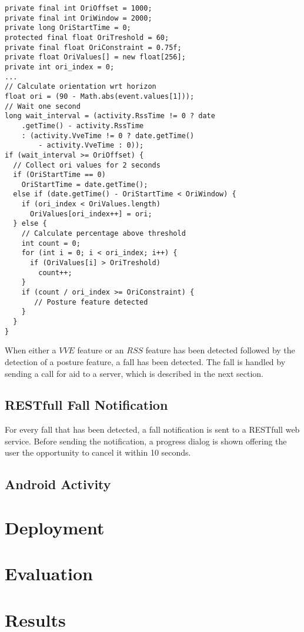 \begin{lstlisting}
private final int OriOffset = 1000;
private final int OriWindow = 2000;
private long OriStartTime = 0;
protected final float OriTreshold = 60;
private final float OriConstraint = 0.75f;
private float OriValues[] = new float[256];
private int ori_index = 0;
...
// Calculate orientation wrt horizon
float ori = (90 - Math.abs(event.values[1]));
// Wait one second
long wait_interval = (activity.RssTime != 0 ? date
    .getTime() - activity.RssTime
    : (activity.VveTime != 0 ? date.getTime()
        - activity.VveTime : 0));
if (wait_interval >= OriOffset) {
  // Collect ori values for 2 seconds
  if (OriStartTime == 0)
    OriStartTime = date.getTime();
  else if (date.getTime() - OriStartTime < OriWindow) {
    if (ori_index < OriValues.length)
      OriValues[ori_index++] = ori;
  } else {
    // Calculate percentage above threshold
    int count = 0;
    for (int i = 0; i < ori_index; i++) {
      if (OriValues[i] > OriTreshold)
        count++;
    }
    if (count / ori_index >= OriConstraint) {
       // Posture feature detected
    }
  }
}
\end{lstlisting}
When either a $VVE$ feature or an $RSS$ feature has been detected followed by the detection of a posture feature, a fall has been detected. The fall is handled by sending a call for aid to a server, which is described in the next section.

\subsection{RESTfull Fall Notification}
For every fall that has been detected, a fall notification is sent to a RESTfull web service. Before sending the notification, a progress dialog is shown offering the user the opportunity to cancel it within 10 seconds. 

\subsection{Android Activity}

\section{Deployment}

\section{Evaluation}
\section{Results}



